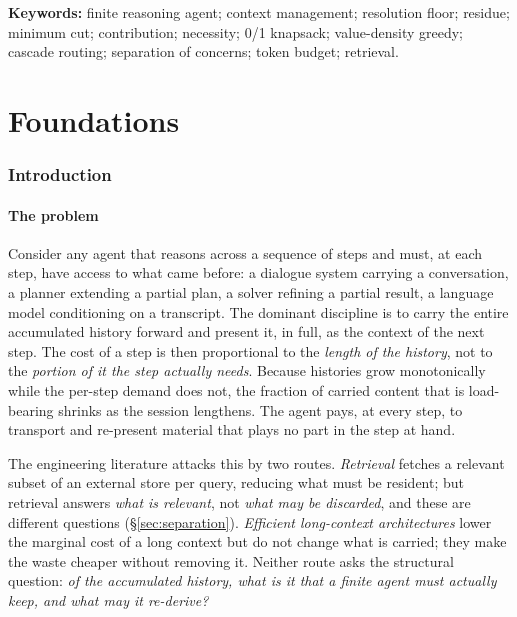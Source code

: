 \documentclass[11pt,twocolumn,a4paper]{article}
\theoremstyle{thmstyle}
\theoremstyle{definition}
\theoremstyle{remark}
\begin{document}
\vspace{4pt}
\noindent\textbf{Keywords:} finite reasoning agent; context management; resolution
floor; residue; minimum cut; contribution; necessity; 0/1 knapsack; value-density
greedy; cascade routing; separation of concerns; token budget; retrieval.

\tableofcontents

\part{Foundations}

\section{Introduction}
\label{sec:intro}

\subsection{The problem}

Consider any agent that reasons across a sequence of steps and must, at each
step, have access to what came before: a dialogue system carrying a
conversation, a planner extending a partial plan, a solver refining a partial
result, a language model conditioning on a transcript. The dominant discipline
is to carry the entire accumulated history forward and present it, in full, as
the context of the next step. The cost of a step is then proportional to the
\emph{length of the history}, not to the \emph{portion of it the step actually
needs}. Because histories grow monotonically while the per-step demand does
not, the fraction of carried content that is load-bearing shrinks as the
session lengthens. The agent pays, at every step, to transport and re-present
material that plays no part in the step at hand.

The engineering literature attacks this by two routes. \emph{Retrieval}
\citep{lewis2020} fetches a relevant subset of an external store per query,
reducing what must be resident; but retrieval answers \emph{what is relevant},
not \emph{what may be discarded}, and these are different questions
(\S\ref{sec:separation}). \emph{Efficient long-context architectures}
\citep{tay2022,vaswani2017} lower the marginal cost of a long context but do not
change what is carried; they make the waste cheaper without removing it. Neither
route asks the structural question: \emph{of the accumulated history, what is it
that a finite agent must actually keep, and what may it re-derive?}
\end{document}
